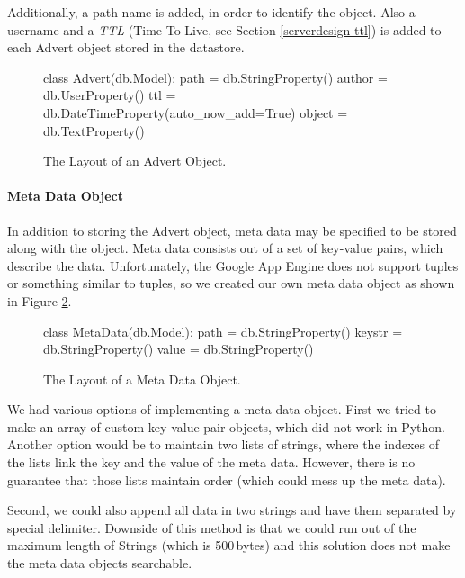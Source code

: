 Additionally, a path name is added, in order to identify the object. Also a
username and a \emph{TTL} (Time To Live, see Section \ref{serverdesign-ttl}) is
added to each Advert object stored in the datastore.

\begin{figure}[ht] %
\begin{center}
\begin{code}
class Advert(db.Model):
  path   = db.StringProperty()
  author = db.UserProperty()
  ttl    = db.DateTimeProperty(auto_now_add=True)
  object = db.TextProperty() 
\end{code}
\caption{The Layout of an Advert Object.\label{serverdesign-advert-obj}}
\end{center}
\end{figure}

\paragraph{Meta Data Object}
In addition to storing the Advert object, meta data may be specified to be
stored along with the object. Meta data consists out of a set of key-value
pairs, which describe the data. Unfortunately, the Google App Engine does not
support tuples or something similar to tuples, so we created our own meta data
object as shown in Figure \ref{serverdesign-metadata-obj}.

\begin{figure}[ht] %
\begin{center}
\begin{code}
class MetaData(db.Model):
  path   = db.StringProperty()
  keystr = db.StringProperty()
  value  = db.StringProperty()
\end{code}
\caption{The Layout of a Meta Data Object.\label{serverdesign-metadata-obj}}
\end{center}
\end{figure}

We had various options of implementing a meta data object. First we tried to
make an array of custom key-value pair objects, which did not work in Python.
Another option would be to maintain two lists of strings, where the indexes of
the lists link the key and the value of the meta data. However, there is no
guarantee that those lists maintain order (which could mess up the meta data).

Second, we could also append all data in two strings and have them separated by
special delimiter. Downside of this method is that we could run out of the
maximum length of Strings (which is 500\,bytes) and this solution does not make
the meta data objects searchable. 

